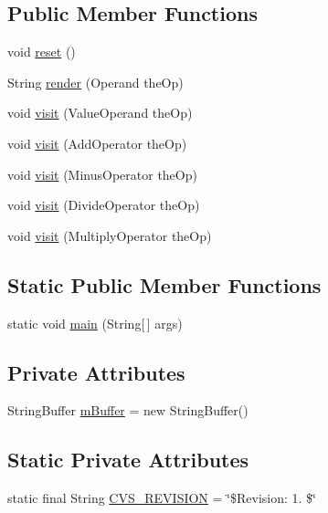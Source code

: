 \subsection*{Public Member Functions}
\begin{DoxyCompactItemize}
\item 
void \hyperlink{classexamples_1_1math_1_1_repl_visitor_a54e7160dc739f6f3482b0c6cb2c7bb98}{reset} ()
\item 
String \hyperlink{classexamples_1_1math_1_1_repl_visitor_a830fa5349e57d852e1c58daeb561b382}{render} (Operand the\-Op)
\item 
void \hyperlink{classexamples_1_1math_1_1_repl_visitor_a212626ac0be8bf7c6fc8325ca449411c}{visit} (Value\-Operand the\-Op)
\item 
void \hyperlink{classexamples_1_1math_1_1_repl_visitor_a0d9ba88819f890c1bc0fe5d9f975ff5b}{visit} (Add\-Operator the\-Op)
\item 
void \hyperlink{classexamples_1_1math_1_1_repl_visitor_a74417f3ea96c9f5b7a348e8751c05520}{visit} (Minus\-Operator the\-Op)
\item 
void \hyperlink{classexamples_1_1math_1_1_repl_visitor_ac3545efa7921a0b13e6bc163f9425dc7}{visit} (Divide\-Operator the\-Op)
\item 
void \hyperlink{classexamples_1_1math_1_1_repl_visitor_a97ef8bbd06b776308e084e0fa4a8dcb7}{visit} (Multiply\-Operator the\-Op)
\end{DoxyCompactItemize}
\subsection*{Static Public Member Functions}
\begin{DoxyCompactItemize}
\item 
static void \hyperlink{classexamples_1_1math_1_1_repl_visitor_abceacfe621c4c30e9ca36a2698c2027c}{main} (String\mbox{[}$\,$\mbox{]} args)
\end{DoxyCompactItemize}
\subsection*{Private Attributes}
\begin{DoxyCompactItemize}
\item 
String\-Buffer \hyperlink{classexamples_1_1math_1_1_repl_visitor_a6e79e7ebca0ee2e73f254624da8ca097}{m\-Buffer} = new String\-Buffer()
\end{DoxyCompactItemize}
\subsection*{Static Private Attributes}
\begin{DoxyCompactItemize}
\item 
static final String \hyperlink{classexamples_1_1math_1_1_repl_visitor_ad80fa462c155863fb52defb294153c5b}{C\-V\-S\-\_\-\-R\-E\-V\-I\-S\-I\-O\-N} = \char`\"{}\$Revision\-: 1. \$\char`\"{}
\end{DoxyCompactItemize}
